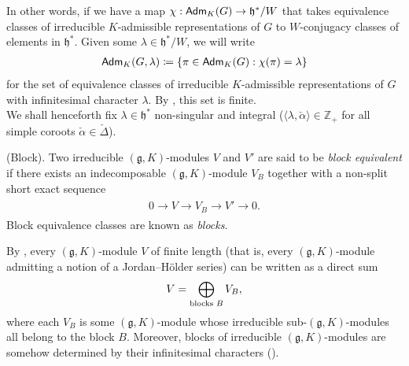 \noindent In other words, if we have a map $\chi : \textup{\textsf{Adm}}_K(G) \to \mathfrak{h}^*/W$ that takes equivalence classes of irreducible $K$-admissible representations of $G$ to $W$-conjugacy classes of elements in $\mathfrak{h}^*$. Given some $\lambda \in \mathfrak{h}^*/W$, we will write
\begin{align*}
\begin{split}
\textup{\textsf{Adm}}_K(G, \lambda) \coloneqq \{\pi \in \textup{\textsf{Adm}}_K(G) : \chi(\pi) = \lambda\}
\end{split}
\end{align*}
\noindent for the set of equivalence classes of irreducible $K$-admissible representations of $G$ with infinitesimal character $\lambda$. By \cite[Corollary 5.4.17]{Vog81}, this set is finite.\\

\noindent We shall henceforth fix $\lambda \in \mathfrak{h}^*$ non-singular and integral ($\langle \lambda, \check{\alpha}\rangle \in \mathbb{Z}_+$ for all simple coroots $\check{\alpha} \in \check{\Delta}$).
\newpage

\noindent\begin{definition}\textup{(Block).} Two irreducible $(\mathfrak{g}, K)$-modules $V$ and $V'$ are said to be {\em block equivalent} if there exists an indecomposable $(\mathfrak{g}, K)$-module $V_B$ together with a non-split short exact sequence
\begin{align*}
\begin{split}
0 \to V \to V_B \to V' \to 0.
\end{split}
\end{align*}
Block equivalence classes are known as {\em blocks}.\\
\end{definition}

\noindent By \cite[Lemma 9.2.3]{Vog81}, every $(\mathfrak{g}, K)$-module $V$ of finite length (that is, every $(\mathfrak{g}, K)$-module admitting a notion of a Jordan--H\"{o}lder series) can be written as a direct sum
\begin{align*}
\begin{split}
V = \bigoplus_\textup{blocks $B$} V_B,
\end{split}
\end{align*}
\noindent where each $V_B$ is some $(\mathfrak{g}, K)$-module whose irreducible sub-$(\mathfrak{g}, K)$-modules all belong to the block $B$. Moreover, blocks of irreducible $(\mathfrak{g}, K)$-modules are somehow determined by their infinitesimal characters (\cite[Theorem 9.2.11]{Vog81}).\\

